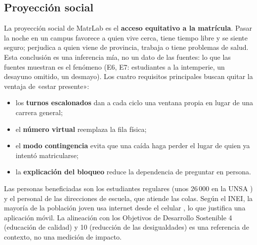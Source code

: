 \subsection{Proyección social}
La proyección social de MatrLab es el \textbf{acceso equitativo a la matrícula}. Pasar la noche en un campus favorece a quien vive cerca, tiene tiempo libre y se siente seguro; perjudica a quien viene de provincia, trabaja o tiene problemas de salud. Esta conclusión es una inferencia mía, no un dato de las fuentes: lo que las fuentes muestran es el fenómeno (E6, E7: estudiantes a la intemperie, un desayuno omitido, un desmayo). Los cuatro requisitos principales buscan quitar la ventaja de «estar presente»:

\begin{itemize}
	\item los \textbf{turnos escalonados} dan a cada ciclo una ventana propia en lugar de una carrera general;
	\item el \textbf{número virtual} reemplaza la fila física;
	\item el \textbf{modo contingencia} evita que una caída haga perder el lugar de quien ya intentó matricularse;
	\item la \textbf{explicación del bloqueo} reduce la dependencia de preguntar en persona.
\end{itemize}

Las personas beneficiadas son los estudiantes regulares (unos 26\,000 en la UNSA \cite{elpueblo25}) y el personal de las direcciones de escuela, que atiende las colas. Según el INEI, la mayoría de la población joven usa internet desde el celular \cite{inei}, lo que justifica una aplicación móvil. La alineación con los Objetivos de Desarrollo Sostenible 4 (educación de calidad) y 10 (reducción de las desigualdades) es una referencia de contexto, no una medición de impacto.
